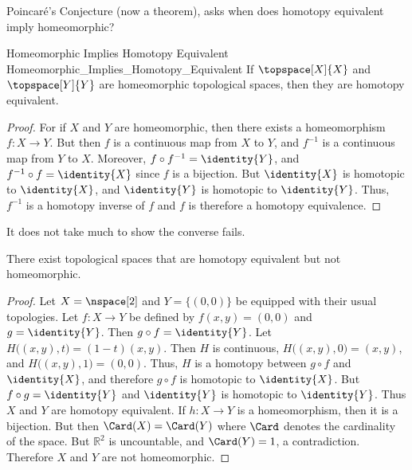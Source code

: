 \documentclass{book}                                                           %
\begin{document}
                Poincar\'{e}'s Conjecture (now a theorem), asks when does
                homotopy equivalent imply homeomorphic?
                \begin{ltheorem}{Homeomorphic Implies Homotopy Equivalent}
                                {Homeomorphic_Implies_Homotopy_Equivalent}
                    If $\topspace[X]{X}$ and $\topspace[Y]{Y}$ are homeomorphic
                    topological spaces, then they are homotopy equivalent.
                \end{ltheorem}
                \begin{proof}
                    For if $X$ and $Y$ are homeomorphic, then there exists a
                    homeomorphism $f:X\rightarrow{Y}$. But then $f$ is a
                    continuous map from $X$ to $Y$, and $f^{-1}$ is a continuous
                    map from $Y$ to $X$. Moreover,
                    ${f}\circ{f^{-1}}=\identity{Y}$, and
                    ${f^{-1}}\circ{f}=\identity{X}$ since $f$ is a bijection.
                    But $\identity{X}$ is homotopic to $\identity{X}$, and
                    $\identity{Y}$ is homotopic to $\identity{Y}$. Thus,
                    $f^{\minus{1}}$ is a homotopy inverse of $f$ and $f$ is
                    therefore a homotopy equivalence.
                \end{proof}
                It does not take much to show the converse fails.
                \begin{theorem}
                    \label{thm:homotopic_does_not_imply_homeomorphic}%
                    There exist topological spaces that are homotopy equivalent
                    but not homeomorphic.
                \end{theorem}
                \begin{proof}
                    Let $X=\nspace[2]$ and $Y=\{(0,0)\}$ be equipped with their
                    usual topologies. Let $f:X\rightarrow{Y}$ be defined by
                    $f(x,y)=(0,0)$ and $g=\identity{Y}$. Then
                    $g\circ{f}=\identity{Y}$. Let
                    $H\big((x,y),t\big)=(1-t)(x,y)$. Then $H$ is continuous,
                    $H\big((x,y),0\big)=(x,y)$, and $H\big((x,y),1\big)=(0,0)$.
                    Thus, $H$ is a homotopy between ${g}\circ{f}$ and
                    $\identity{X}$, and therefore ${g}\circ{f}$ is homotopic to
                    $\identity{X}$. But ${f}\circ{g}=\identity{Y}$ and
                    $\identity{Y}$ is homotopic to $\identity{Y}$. Thus $X$ and
                    $Y$ are homotopy equivalent. If $h:{X}\rightarrow{Y}$ is a
                    homeomorphism, then it is a bijection. But then
                    $\Card(X)=\Card(Y)$ where $\Card$ denotes the cardinality
                    of the space. But $\mathbb{R}^{2}$ is uncountable, and
                    $\Card(Y)=1$, a contradiction. Therefore $X$ and $Y$ are not
                    homeomorphic.
                \end{proof}
\end{document}
